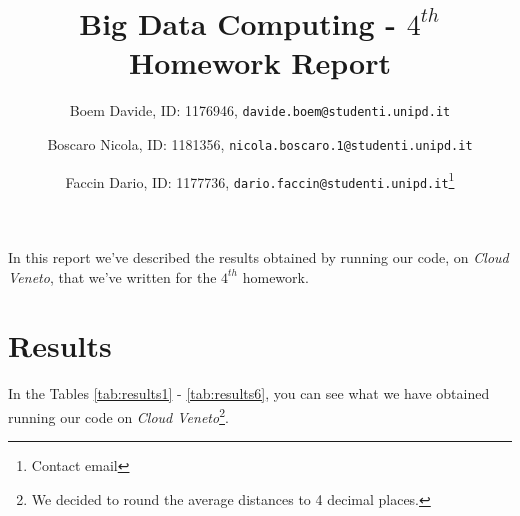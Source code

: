 \documentclass[10pt]{article}
\begin{document}
 
 
 
\title{Big Data Computing - $4^{th}$ Homework Report}
\author{Boem Davide, ID: 1176946, \texttt{davide.boem@studenti.unipd.it} \and Boscaro Nicola, ID: 1181356, \texttt{nicola.boscaro.1@studenti.unipd.it} \and Faccin Dario, ID: 1177736, \texttt{dario.faccin@studenti.unipd.it}\footnote{Contact email}}
\date{}
 
\maketitle


In this report we've described the results obtained by running our code, on \textit{Cloud Veneto}, that we've written for the $4^{th}$ homework.

\section{Results}

In the Tables \ref{tab:results1} - \ref{tab:results6}, you can see what we have obtained running our code on \textit{Cloud Veneto}\footnote{We decided to round the average distances to 4 decimal places.}.
\end{document}
